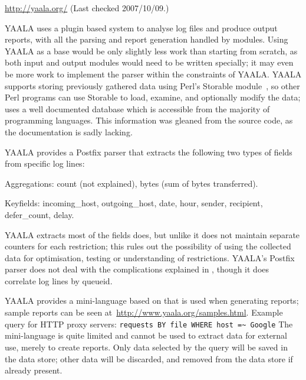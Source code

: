 \noindent{}\url{http://yaala.org/} \newline{}
(Last checked 2007/10/09.)

YAALA uses a plugin based system to analyse log files and produce \HTML{}
output reports, with all the parsing and report generation handled by
modules.  Using YAALA as a base would be only slightly less work than
starting from scratch, as both input and output modules would need to be
written specially; it may even be more work to implement the parser within
the constraints of YAALA\@.  YAALA supports storing previously gathered
data using Perl's Storable module~\cite{perl-storable}, so other Perl
programs can use Storable to load, examine, and optionally modify the data;
\parsername{} uses a well documented database which is accessible from the
majority of programming languages.  This information was gleaned from the
source code, as the documentation is sadly lacking.

YAALA provides a Postfix parser that extracts the following two types of
fields from specific log lines:

\begin{eqlist}

    \item [Aggregations:] count (not explained), bytes (sum of bytes
        transferred).

    \item [Keyfields:] incoming\_host, outgoing\_host, date, hour, sender,
        recipient, defer\_count, delay.

\end{eqlist}

YAALA extracts most of the fields \parsername{} does, but unlike
\parsername{} it does not maintain separate counters for each restriction;
this rules out the possibility of using the collected data for
optimisation, testing or understanding of restrictions.  YAALA's Postfix
parser does not deal with the complications explained in
, though it does correlate log lines by queueid.

YAALA provides a mini-language based on \SQL{} that is used when generating
reports; sample reports can be seen
at~\url{http://www.yaala.org/samples.html}.  Example query for HTTP proxy
servers: \newline{} \tab{} \texttt{requests BY file WHERE host =\~{}
Google} \newline{} The mini-language is quite limited and cannot be used to
extract data for external use, merely to create reports.  Only data
selected by the query will be saved in the data store; other data will be
discarded, and removed from the data store if already present.

